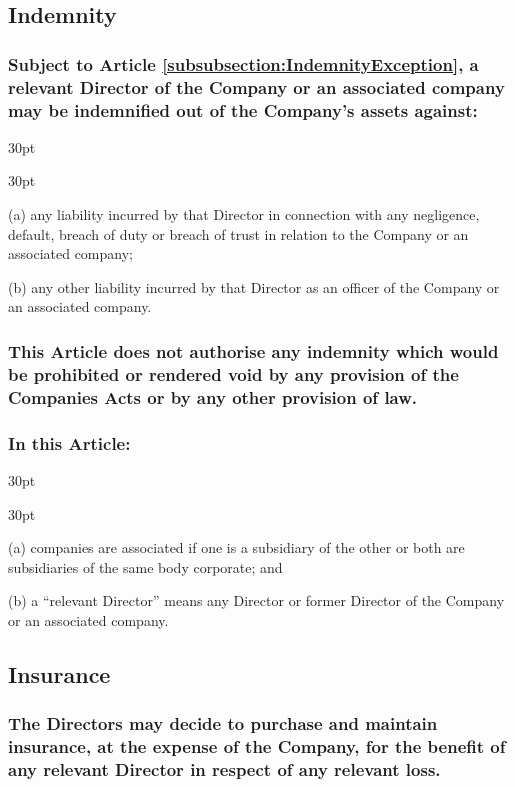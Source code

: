 \documentclass[12pt]{article}
\def\clauseindent{30pt}
\newenvironment{subindentlist}{\begin{adjustwidth}{\clauseindent}{}\begin{labeledlist}{\clauseindent}}{\end{labeledlist}\end{adjustwidth}}
\begin{document}
\subsection{Indemnity}
\subsubsection{Subject to Article \ref{subsubsection:IndemnityException}, a relevant Director of the Company or an associated company may be indemnified out of the Company's assets against:}
\begin{subindentlist}
    \item [(a)] any liability incurred by that Director in connection with any negligence, default, breach of duty or breach of trust in relation to the Company or an associated company;
    \item [(b)] any other liability incurred by that Director as an officer of the Company or an associated company.
\end{subindentlist}
\subsubsection{\label{subsubsection:IndemnityException}This Article does not authorise any indemnity which would be prohibited or rendered void by any provision of the Companies Acts or by any other provision of law.}
\subsubsection{In this Article:}
\begin{subindentlist}
    \item [(a)] companies are associated if one is a subsidiary of the other or both are subsidiaries of the same body corporate; and
    \item [(b)] a ``relevant Director'' means any Director or former Director of the Company or an associated company.
\end{subindentlist}

\subsection{Insurance}
\subsubsection{The Directors may decide to purchase and maintain insurance, at the expense of the Company, for the benefit of any relevant Director in respect of any relevant loss.}
\end{document}
